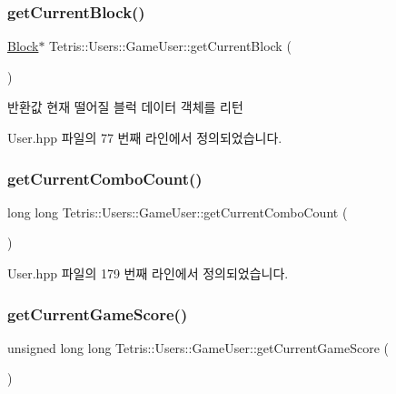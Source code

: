 \subsubsection{\texorpdfstring{get\+Current\+Block()}{getCurrentBlock()}\hspace{0.1cm}{\footnotesize\ttfamily [2/2]}}
{\footnotesize\ttfamily \hyperlink{class_tetris_1_1_block}{Block}$\ast$ Tetris\+::\+Users\+::\+Game\+User\+::get\+Current\+Block (\begin{DoxyParamCaption}{ }\end{DoxyParamCaption})\hspace{0.3cm}{\ttfamily [inline]}}

\begin{DoxyReturn}{반환값}
현재 떨어질 블럭 데이터 객체를 리턴 
\end{DoxyReturn}


User.\+hpp 파일의 77 번째 라인에서 정의되었습니다.

\mbox{\label{class_tetris_1_1_users_1_1_game_user_a761f78f405c3d4445ae147b2c11e8364}} 
\subsubsection{\texorpdfstring{get\+Current\+Combo\+Count()}{getCurrentComboCount()}}
{\footnotesize\ttfamily long long Tetris\+::\+Users\+::\+Game\+User\+::get\+Current\+Combo\+Count (\begin{DoxyParamCaption}{ }\end{DoxyParamCaption})\hspace{0.3cm}{\ttfamily [inline]}}



User.\+hpp 파일의 179 번째 라인에서 정의되었습니다.

\mbox{\label{class_tetris_1_1_users_1_1_game_user_a93bde8123ee0dc9333d62a44b904023c}} 
\subsubsection{\texorpdfstring{get\+Current\+Game\+Score()}{getCurrentGameScore()}}
{\footnotesize\ttfamily unsigned long long Tetris\+::\+Users\+::\+Game\+User\+::get\+Current\+Game\+Score (\begin{DoxyParamCaption}{ }\end{DoxyParamCaption})\hspace{0.3cm}{\ttfamily [inline]}}

